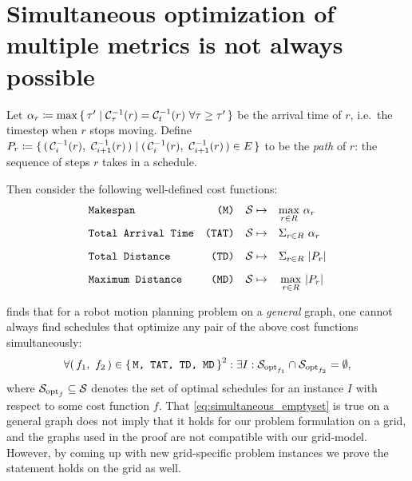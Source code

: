 \section{Simultaneous optimization of multiple metrics is not always possible}\label{chapter:simultaneous_optimization}

Let \(\alpha_r \coloneqq \max\set{\tau' \mid \ensuremath{\mathcal{C}_{\tau}}^{-1}(r) = \ensuremath{\mathcal{C}_{t}}^{-1}(r)\ \forall \tau \geq \tau'}\) be the arrival time of \(r\), i.e.~the timestep when \(r\) stops moving.
Define \(P_r \coloneqq \set{ (\,  \ensuremath{\mathcal{C}_{i}}^{-1}(r),\ \ensuremath{\mathcal{C}_{i + 1}}^{-1}(r)  \,) \mid (\,  \ensuremath{\mathcal{C}_{i}}^{-1}(r),\ \ensuremath{\mathcal{C}_{i + 1}}^{-1}(r)  \,) \in E }\) to be the \emph{path} of \(r\): the sequence of steps \(r\) takes in a schedule. 

Then consider the following well-defined cost functions:
\begin{align*}
	& \texttt{Makespan} 				& \texttt{(M)} && \mathcal{S} \mapsto \quad & \smash{\max_{r \in R}} \ \alpha_r 	\\[2mm] 
	& \texttt{Total Arrival Time} 	& \texttt{(TAT)} && \mathcal{S} \mapsto \quad & \Sigma_{r \in R} \ \alpha_r 		\\[2mm]
	& \texttt{Total Distance} 		& \texttt{(TD)} && \mathcal{S} \mapsto \quad & \Sigma_{r \in R} \ \lvert P_r\rvert 		\\[2mm]
	& \texttt{Maximum Distance} 		& \texttt{(MD)} && \mathcal{S} \mapsto \quad & \max_{r \in R} \ \lvert P_r\rvert
\end{align*}


\cite{corr/YuL15c} finds that for a robot motion planning problem on a \emph{general} graph, one cannot always find schedules that optimize any pair of the above cost functions simultaneously:
\begin{align}\label{eq:simultaneous_emptyset}
	\forall (\, f_1,\ f_2 \,) \in \set{\texttt{M, TAT, TD, MD}}^2 : \exists I : \mathcal{S}_{\text{opt}_{f_1}} \cap \mathcal{S}_{\text{opt}_{f_2}} = \emptyset,
\end{align}
where \(\mathcal{S}_{\text{opt}_f} \subseteq \mathcal{S}\) denotes the set of optimal schedules for an instance \(I\) with respect to some cost function \(f\).
That \cref{eq:simultaneous_emptyset} is true on a general graph does not imply that it holds for our problem formulation on a grid, and the graphs used in the proof are not compatible with our grid-model.
However, by coming up with new grid-specific problem instances we prove the statement holds on the grid as well.

